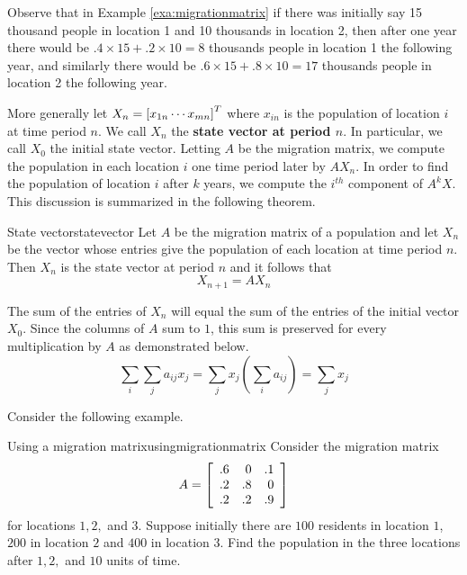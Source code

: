 Observe that in Example \ref{exa:migrationmatrix} if there was initially say 15
thousand people in location 1 and 10 thousands in location 2, then
after one year there would be $.4 \times 15 + .2 \times 10 = 8$
thousands people in location 1 the following year, and similarly 
there would be $.6 \times 15 + .8 \times 10 = 17$
thousands people in location 2 the following year.

More generally let $X_n=\left[ x_{1n} \cdots x_{mn}\right] ^{T}$ where $x_{in}$ is the
population of location $i$ at time period $n$. We call $X_n$ the \textbf{state vector at period $n$}. In particular, we call $X_0$ the initial state vector. Letting $A$ be the migration matrix, we compute the population in each location $i$ one time period later by $AX_n$. In order to find the population of location $i$ after $k$
years, we compute the $i^{th}$ component of $A^{k}X.$ This discussion is summarized in the following theorem. 

\begin{theorem}{State vector}{statevector}
Let $A$ be the migration matrix of a population and let $X_n$ be the vector whose entries give the population of each location at time period $n$. Then $X_n$ is the state vector at period $n$ and it follows that 
\[
X_{n+1} = A X_n
\]
\end{theorem}

The sum of the entries of $X_n$ will equal the sum of the entries of the initial
vector $X_{0}$. Since the columns of $A$ sum to $1$, this sum is preserved for every
multiplication by $A$ as demonstrated below. 
\begin{equation*}
\sum_{i}\sum_{j}a_{ij}x_{j}=\sum_{j}x_{j}\left( \sum_{i}a_{ij}\right)
=\sum_{j}x_{j}
\end{equation*}

Consider the following example.

\begin{example}{Using a migration matrix}{usingmigrationmatrix}
Consider the migration matrix 
\begin{equation*}
A = 
\left[
\begin{array}{rrr}
.6 & 0 & .1 \\
.2 & .8 & 0 \\
.2 & .2 & .9
\end{array}
\right] 
\end{equation*}
 for locations $1,2,$ and $3.$ Suppose initially there are $100$
residents in location $1$, $200$ in location $2$ and $400$ in location $3$. Find the
population in the three locations after $1,2,$ and $10$ units of time.
\end{example}

